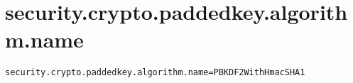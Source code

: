 \section{security.crypto.paddedkey.algorithm.name}
\label{configuration:SecurityCryptoPaddedkeyAlgorithmName}
\AvailableInJavaOnly{\TODO}
\begin{lstlisting}[style=Props,caption={Usage example for \textit{security.crypto.paddedkey.algorithm.name}}]
security.crypto.paddedkey.algorithm.name=PBKDF2WithHmacSHA1
\end{lstlisting}